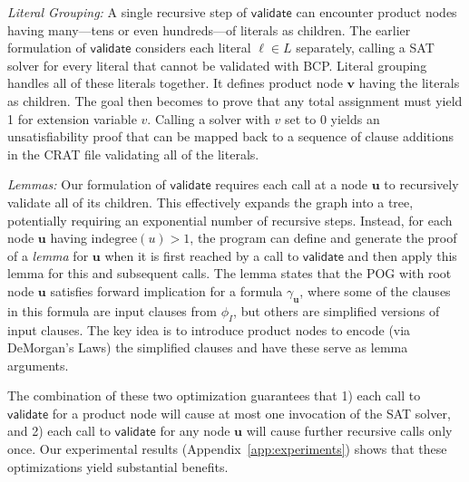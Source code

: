\documentclass[letterpaper,USenglish,cleveref, autoref, thm-restate]{lipics-v2021}
\newcommand{\lit}{\ell}
\newcommand{\indegree}{\textrm{indegree}}
\newcommand{\validate}{\textsf{validate}}
\newcommand{\inputformula}{\phi_I}
\newcommand{\makenode}[1]{\mathbf{#1}}
\newcommand{\nodeu}{\makenode{u}}
\newcommand{\nodev}{\makenode{v}}
\begin{document}
{\em Literal Grouping:} A single recursive step of $\validate$ can encounter product nodes
having many---tens or even hundreds---of literals as children.  The
earlier formulation of $\validate$ considers each literal $\lit \in L$
separately, calling a SAT solver for every literal that cannot be
validated with BCP\@.  Literal grouping handles
all of these literals together.  It defines product node $\nodev$
having the literals as children.  The goal then becomes to prove that
any total assignment must yield 1 for extension variable $v$.  Calling
a solver with $v$ set to 0 yields an unsatisfiability proof that can
be mapped back to a sequence of clause additions in the CRAT file validating
all of the literals.

{\em Lemmas:} Our formulation of $\validate$ requires each call at a
node $\nodeu$ to recursively validate all of its children.  This
effectively expands the graph into a tree, potentially requiring an
exponential number of recursive steps.  Instead, for each node
$\nodeu$ having $\indegree(u) > 1$, the program can define and
generate the proof of a {\em lemma} for $\nodeu$ when it is first reached by
a call to $\validate$ and then apply this lemma for this and
subsequent calls.  The lemma states that the POG with root node
$\nodeu$ satisfies forward implication for a formula
$\gamma_{\nodeu}$, where some of the clauses in this formula are
input clauses from $\inputformula$, but others are simplified
versions of input clauses.
The key idea is to introduce product nodes to encode (via DeMorgan's
Laws) the simplified clauses and have these serve as lemma arguments.

The combination of these two optimization guarantees that 1) each call
to $\validate$ for a product node will cause at most one invocation of
the SAT solver, and 2) each call to $\validate$ for any node $\nodeu$
will cause further recursive calls only once.  Our experimental
results (Appendix~\ref{app:experiments}) shows that these
optimizations yield substantial benefits.



\end{document}
